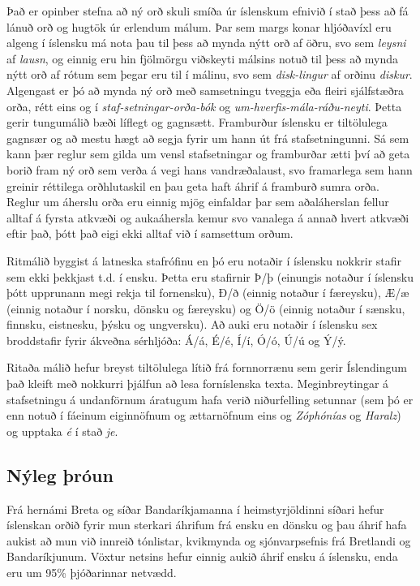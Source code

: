 \documentclass{../../metanetpaper}
\begin{document}
\begin{multicols}{2}
Það er opinber stefna að ný orð skuli smíða úr íslenskum efnivið í stað þess að fá lánuð orð og hugtök úr erlendum málum. Þar sem margs konar hljóðavíxl eru algeng í íslensku má nota þau til þess að mynda nýtt orð af öðru, svo sem \textit{leysni} af \textit{lausn}, og einnig eru hin fjölmörgu viðskeyti málsins notuð til þess að mynda nýtt orð af rótum sem þegar eru til í málinu, svo sem \textit{disk-lingur} af orðinu \textit{diskur}. Algengast er þó að mynda ný orð með samsetningu tveggja eða fleiri sjálfstæðra orða, rétt eins og í \textit{staf-setningar-orða-bók} og \textit{um-hverfis-mála-ráðu-neyti}. Þetta gerir tungumálið bæði líflegt og gagnsætt.
Framburður íslensku er tiltölulega gagnsær og að mestu hægt að segja fyrir um hann út frá stafsetningunni. Sá sem kann þær reglur sem gilda um vensl stafsetningar og framburðar ætti því að geta borið fram ný orð sem verða á vegi hans vandræðalaust, svo framarlega sem hann greinir réttilega orðhlutaskil en þau geta haft áhrif á framburð sumra orða. Reglur um áherslu orða eru einnig mjög einfaldar þar sem aðaláherslan fellur alltaf á fyrsta atkvæði og aukaáhersla kemur svo vanalega á annað hvert atkvæði eftir það, þótt það eigi ekki alltaf við í samsettum orðum.

Ritmálið byggist á latneska stafrófinu en þó eru notaðir í íslensku nokkrir stafir sem ekki þekkjast t.d. í ensku. Þetta eru stafirnir Þ/þ (einungis notaður í íslensku þótt upprunann megi rekja til fornensku), Ð/ð (einnig notaður í færeysku), Æ/æ (einnig notaður í norsku, dönsku og færeysku) og Ö/ö (einnig notaður í sænsku, finnsku, eistnesku, þýsku og ungversku). Að auki eru notaðir í íslensku sex broddstafir fyrir ákveðna sérhljóða: Á/á, É/é, Í/í, Ó/ó, Ú/ú og Ý/ý.

Ritaða málið hefur breyst tiltölulega lítið frá fornnorrænu sem gerir Íslendingum það kleift með nokkurri þjálfun að lesa forníslenska texta. Meginbreytingar á stafsetningu á undanförnum áratugum hafa verið niðurfelling setunnar (sem þó er enn notuð í fáeinum eiginnöfnum og ættarnöfnum eins og \textit{Zóphónías} og \textit{Haralz}) og upptaka \textit{é} í stað \textit{je}.

\subsection{Nýleg þróun}

Frá hernámi Breta og síðar Bandaríkjamanna í heimstyrjöldinni síðari hefur íslenskan orðið fyrir mun sterkari áhrifum frá ensku en dönsku og þau áhrif hafa aukist að mun við innreið tónlistar, kvikmynda og sjónvarpsefnis frá Bretlandi og Bandaríkjunum. Vöxtur netsins hefur einnig aukið áhrif ensku á íslensku, enda eru um 95\% þjóðarinnar netvædd. 


\end{multicols}
\end{document}
